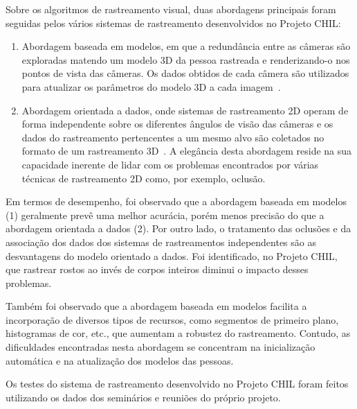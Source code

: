 Sobre os algoritmos de rastreamento visual, duas abordagens principais foram seguidas pelos vários sistemas de rastreamento desenvolvidos no Projeto CHIL:

	\begin{enumerate}
		\item Abordagem baseada em modelos, em que a redundância entre as câmeras são exploradas matendo um modelo 3D da pessoa rastreada e renderizando-o nos pontos de vista das câmeras. Os dados obtidos de cada câmera são utilizados para atualizar os parâmetros do modelo 3D a cada imagem~\cite{chilref1,chilref2,chilref3}. 
		\item Abordagem orientada a dados, onde sistemas de rastreamento 2D operam de forma independente sobre os diferentes ângulos de visão das câmeras e os dados do rastreamento pertencentes a um mesmo alvo são coletados no formato de um rastreamento 3D~\cite{chilref4,chilref5}. A elegância desta abordagem reside na sua capacidade inerente de lidar com os problemas encontrados por várias técnicas de rastreamento 2D como, por exemplo, oclusão.
	\end{enumerate}	

 Em termos de desempenho, foi observado que a abordagem baseada em modelos (1) geralmente prevê uma melhor acurácia, porém menos precisão do que a abordagem orientada a dados (2). Por outro lado, o tratamento das oclusões e da associação dos dados dos sistemas de rastreamentos independentes são as desvantagens do modelo orientado a dados. Foi identificado, no Projeto CHIL, que rastrear rostos ao invés de corpos inteiros diminui o impacto desses problemas.

 Também foi observado que a abordagem baseada em modelos facilita a incorporação de diversos tipos de recursos, como segmentos de primeiro plano, histogramas de cor, etc., que aumentam a robustez do rastreamento. Contudo, as dificuldades encontradas nesta abordagem se concentram na inicialização automática e na atualização dos modelos das pessoas.

 Os testes do sistema de rastreamento desenvolvido no Projeto CHIL foram feitos utilizando os dados dos seminários e reuniões do próprio projeto.



